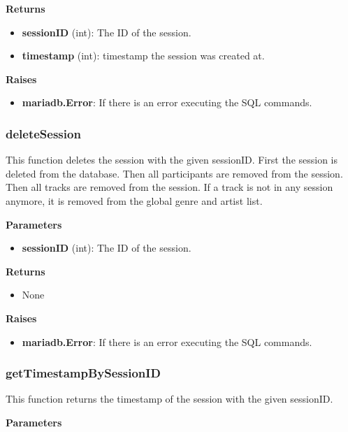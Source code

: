 \documentclass[oneside, ngerman]{sdqtechreport}
\begin{document}
\textbf{Returns}

\begin{itemize} \item \textbf{sessionID} (int): The ID of the session. \item \textbf{timestamp} (int): timestamp the session was created at. \end{itemize}

\textbf{Raises}

\begin{itemize} \item \textbf{mariadb.Error}: If there is an error executing the SQL commands. \end{itemize}

\subsubsection{deleteSession}

This function deletes the session with the given sessionID. First the session is deleted from the database. Then all participants are removed from the session. Then all tracks are removed from the session. If a track is not in any session anymore, it is removed from the global genre and artist list.

\textbf{Parameters}

\begin{itemize} \item \textbf{sessionID} (int): The ID of the session. \end{itemize}

\textbf{Returns}

\begin{itemize} \item None \end{itemize}

\textbf{Raises}

\begin{itemize} \item \textbf{mariadb.Error}: If there is an error executing the SQL commands. \end{itemize}

\subsubsection{getTimestampBySessionID}

This function returns the timestamp of the session with the given sessionID.

\textbf{Parameters}
\end{document}
